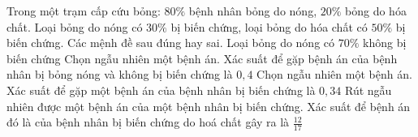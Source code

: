 \begin{ex}%
    Trong một trạm cấp cứu bỏng: $80\%$ bệnh nhân bỏng do nóng, $20\%$ bỏng do hóa chất. Loại bỏng do nóng có $30\%$ bị biến chứng, loại bỏng do hóa chất có $50\%$ bị biến chứng. Các mệnh đề sau đúng hay sai.
    \choiceTF
    {\True Loại bỏng do nóng có $70\%$ không bị biến chứng}
    { Chọn ngẫu nhiên một bệnh án. Xác suất để gặp bệnh án của bệnh nhân bị bỏng nóng và không bị biến chứng là $0,4$}
    {\True Chọn ngẫu nhiên một bệnh án. Xác suất để gặp một bệnh án của bệnh nhân bị biến chứng là $0,34$}
    { Rút ngẫu nhiên được một bệnh án của một bệnh nhân bị biến chứng. Xác suất để bệnh án đó là của bệnh nhân bị biến chứng do hoá chất gây ra là $\frac{12}{17}$}
\end{ex}
